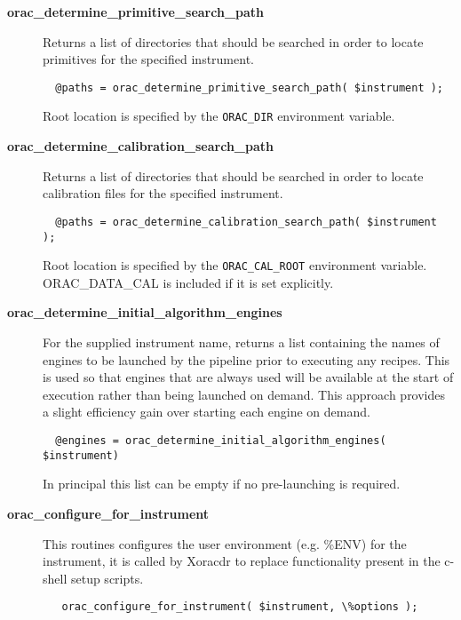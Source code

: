 \begin{description}
\item[{\textbf{orac\_determine\_primitive\_search\_path}}] \mbox{}

Returns a list of directories that should be searched in order
to locate primitives for the specified instrument.

\begin{verbatim}
  @paths = orac_determine_primitive_search_path( $instrument );
\end{verbatim}


Root location is specified by the \texttt{ORAC\_DIR} environment
variable.


\item[{\textbf{orac\_determine\_calibration\_search\_path}}] \mbox{}

Returns a list of directories that should be searched in order
to locate calibration files for the specified instrument.

\begin{verbatim}
  @paths = orac_determine_calibration_search_path( $instrument );
\end{verbatim}


Root location is specified by the \texttt{ORAC\_CAL\_ROOT} environment
variable. ORAC\_DATA\_CAL is included if it is set explicitly.


\item[{\textbf{orac\_determine\_initial\_algorithm\_engines}}] \mbox{}

For the supplied instrument name, returns a list containing the names
of engines to be launched by the pipeline prior to executing any
recipes. This is used so that engines that are always used will be
available at the start of execution rather than being launched on
demand. This approach provides a slight efficiency gain over starting
each engine on demand.

\begin{verbatim}
  @engines = orac_determine_initial_algorithm_engines( $instrument)
\end{verbatim}


In principal this list can be empty if no pre-launching is required.


\item[{\textbf{orac\_configure\_for\_instrument}}] \mbox{}

This routines configures the user environment (e.g. \%ENV) for the instrument,
it is called by Xoracdr to replace functionality present in the c-shell setup scripts.

\begin{verbatim}
   orac_configure_for_instrument( $instrument, \%options );
\end{verbatim}


\end{description}
